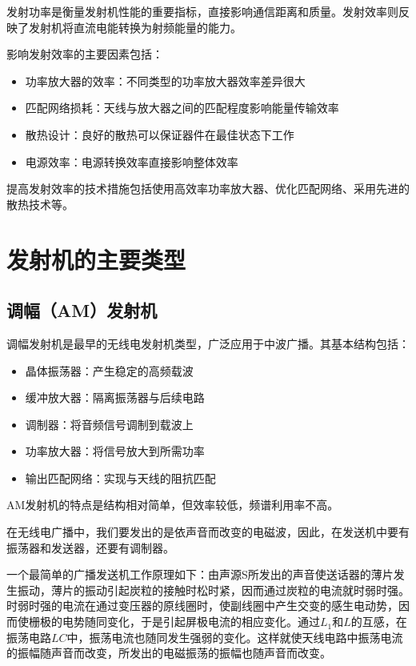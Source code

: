 \documentclass[12pt,UTF8]{ctexbook}
\begin{document}
发射功率是衡量发射机性能的重要指标，直接影响通信距离和质量。发射效率则反映了发射机将直流电能转换为射频能量的能力。

影响发射效率的主要因素包括：
\begin{itemize}[leftmargin=3.5em]
    \item 功率放大器的效率：不同类型的功率放大器效率差异很大
    \item 匹配网络损耗：天线与放大器之间的匹配程度影响能量传输效率
    \item 散热设计：良好的散热可以保证器件在最佳状态下工作
    \item 电源效率：电源转换效率直接影响整体效率
\end{itemize}

提高发射效率的技术措施包括使用高效率功率放大器、优化匹配网络、采用先进的散热技术等。

\section{发射机的主要类型}

\subsection{调幅（AM）发射机}

调幅发射机是最早的无线电发射机类型，广泛应用于中波广播。其基本结构包括：

\begin{itemize}[leftmargin=3.5em]
    \item 晶体振荡器：产生稳定的高频载波
    \item 缓冲放大器：隔离振荡器与后续电路
    \item 调制器：将音频信号调制到载波上
    \item 功率放大器：将信号放大到所需功率
    \item 输出匹配网络：实现与天线的阻抗匹配
\end{itemize}

AM发射机的特点是结构相对简单，但效率较低，频谱利用率不高。

在无线电广播中，我们要发出的是依声音而改变的电磁波，因此，在发送机中要有振荡器和发送器，还要有调制器。

一个最简单的广播发送机工作原理如下：由声源S所发出的声音使送话器的薄片发生振动，薄片的振动引起炭粒的接触时松时紧，因而通过炭粒的电流就时弱时强。时弱时强的电流在通过变压器的原线圈时，使副线圈中产生交变的感生电动势，因而使栅极的电势随同变化，于是引起屏极电流的相应变化。通过$L_1$和$L$的互感，在振荡电路$LC$中，振荡电流也随同发生强弱的变化。这样就使天线电路中振荡电流的振幅随声音而改变，所发出的电磁振荡的振幅也随声音而改变。
\end{document}
